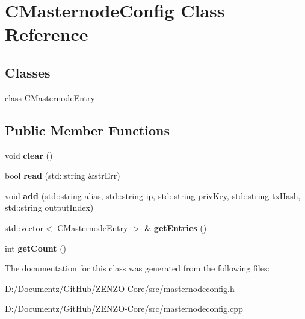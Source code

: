 \hypertarget{class_c_masternode_config}{}\section{C\+Masternode\+Config Class Reference}
\label{class_c_masternode_config}
\subsection*{Classes}
\begin{DoxyCompactItemize}
\item 
class \mbox{\hyperlink{class_c_masternode_config_1_1_c_masternode_entry}{C\+Masternode\+Entry}}
\end{DoxyCompactItemize}
\subsection*{Public Member Functions}
\begin{DoxyCompactItemize}
\item 
\mbox{\label{class_c_masternode_config_af6dab86b7e6b5bf0df9392fc7daedc3f}} 
void {\bfseries clear} ()
\item 
\mbox{\label{class_c_masternode_config_a028d769bc39a23177cf81a3e433b6e86}} 
bool {\bfseries read} (std\+::string \&str\+Err)
\item 
\mbox{\label{class_c_masternode_config_a578068fd91293257e3f302c002c6ba43}} 
void {\bfseries add} (std\+::string alias, std\+::string ip, std\+::string priv\+Key, std\+::string tx\+Hash, std\+::string output\+Index)
\item 
\mbox{\label{class_c_masternode_config_a21fb5f410e3dcd55429f256d4efe4e61}} 
std\+::vector$<$ \mbox{\hyperlink{class_c_masternode_config_1_1_c_masternode_entry}{C\+Masternode\+Entry}} $>$ \& {\bfseries get\+Entries} ()
\item 
\mbox{\label{class_c_masternode_config_ab67434f7d279d4837f4999f10265cd2f}} 
int {\bfseries get\+Count} ()
\end{DoxyCompactItemize}


The documentation for this class was generated from the following files\+:\begin{DoxyCompactItemize}
\item 
D\+:/\+Documentz/\+Git\+Hub/\+Z\+E\+N\+Z\+O-\/\+Core/src/masternodeconfig.\+h\item 
D\+:/\+Documentz/\+Git\+Hub/\+Z\+E\+N\+Z\+O-\/\+Core/src/masternodeconfig.\+cpp\end{DoxyCompactItemize}
